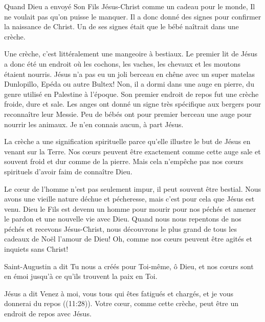 

Quand Dieu a envoyé Son Fils Jésus-Christ comme un cadeau pour le monde, Il ne voulait pas qu'on puisse le manquer. Il a donc donné des signes pour confirmer la naissance de Christ. Un de ses signes était que le bébé naîtrait dans une crèche. 

Une crèche, c'est littéralement une mangeoire à bestiaux. Le premier lit de Jésus a donc été un endroit où les cochons, les vaches, les chevaux et les moutons étaient nourris. Jésus n'a pas eu un joli berceau en chêne avec un super matelas Dunlopillo, Epéda ou autre Bultex! Non, il a dormi dans une auge en pierre, du genre utilisé en Palestine à l'époque. Son premier endroit de repos fut une crèche froide, dure et sale. Les anges ont donné un signe très spécifique aux bergers pour reconnaître leur Messie. Peu de bébés ont pour premier berceau une auge pour nourrir les animaux. Je n'en connais aucun, à part Jésus. 

La crèche a une signification spirituelle parce qu'elle illustre le but de Jésus en venant sur la Terre. Nos cœurs peuvent être exactement comme cette auge \ocadr sale et souvent froid et dur comme de la pierre. Mais cela n'empêche pas nos cœurs spirituels d'avoir faim de connaître Dieu.

Le cœur de l'homme n'est pas seulement impur, il peut souvent être bestial. Nous avons une vieille nature déchue et pécheresse, mais c'est pour cela que Jésus est venu. Dieu le Fils est devenu un homme pour mourir pour nos péchés et amener le pardon et une nouvelle vie avec Dieu. Quand nous nous repentons de nos péchés et recevons Jésus-Christ, nous découvrons le plus grand de tous les cadeaux de Noël\frcolon{} l'amour de Dieu! Oh, comme nos cœurs peuvent être agités et inquiets sans Christ! 

Saint-Augustin a dit\frcolon{} \Og Tu nous a créés pour Toi-même, ô Dieu, et nos c\oe{}urs sont en émoi jusqu’à ce qu’ils trouvent la paix en Toi. \Fg{}

Jésus a dit\frcolon{} \Og Venez à moi, vous tous qui êtes fatigués et chargés, et je vous donnerai du repos \Fg{} ((11:28)). Votre cœur, comme cette crèche, peut être un endroit de repos avec Jésus.



